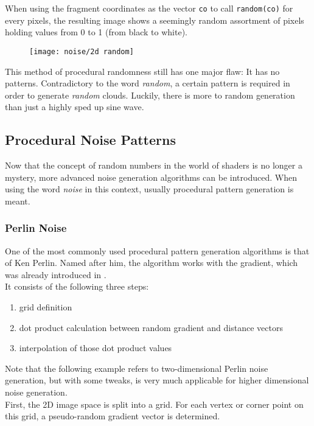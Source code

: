 \noindent
When using the fragment coordinates as the vector \lstinline[language=HLSL]{co} to call \lstinline[language=HLSL]{random(co)} for every pixels, the resulting image shows a seemingly random assortment of pixels holding values from 0 to 1 (from black to white).

\begin{figure}[H]
    \centering
            \texttt{[image: noise/2d random]}
            \label{img:noise:2d:random}
\end{figure}

\noindent
This method of \gls{procedural} randomness still has one major flaw: It has no patterns. Contradictory to the word \textit{random}, a certain pattern is required in order to generate \textit{random} clouds. Luckily, there is more to random generation than just a highly sped up sine wave.

\clearpage
\subsection{Procedural Noise Patterns}
Now that the concept of random numbers in the world of shaders is no longer a mystery, more advanced noise generation algorithms can be introduced.
When using the word \textit{\gls{noise}} in this context, usually \gls{procedural} pattern generation is meant.

\subsubsection{Perlin Noise}
One of the most commonly used \gls{procedural} pattern generation algorithms is that of Ken Perlin. Named after him, the algorithm works with the gradient, which was already introduced in .
\\
It consists of the following three steps: 
\begin{enumerate}
    \item grid definition
    \item dot product calculation between random gradient and distance vectors
    \item interpolation of those dot product values
\end{enumerate}

\noindent
Note that the following example refers to two-dimensional Perlin noise generation, but with some tweaks, is very much applicable for higher dimensional noise generation.
\\
First, the 2D image space is split into a grid. For each vertex or corner point on this grid, a pseudo-random gradient vector is determined.

